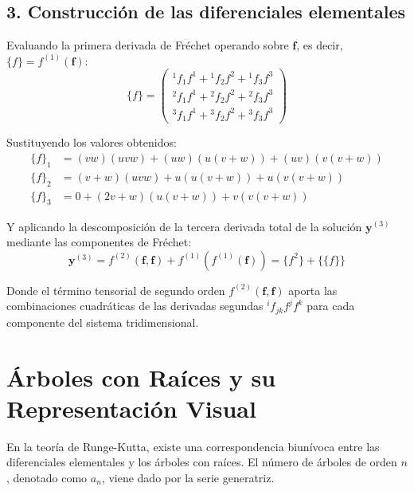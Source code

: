\subsection*{3. Construcción de las diferenciales elementales}

Evaluando la primera derivada de Fréchet operando sobre $\mathbf{f}$, es decir, $\{f\} = f^{(1)}(\mathbf{f})$:
$$ \{f\} = \begin{pmatrix} 
    {^1}f_1 f^1 + {^1}f_2 f^2 + {^1}f_3 f^3 \\ 
    {^2}f_1 f^1 + {^2}f_2 f^2 + {^2}f_3 f^3 \\ 
    {^3}f_1 f^1 + {^3}f_2 f^2 + {^3}f_3 f^3 
\end{pmatrix} $$

Sustituyendo los valores obtenidos:
\begin{align*}
    \{f\}_1 &= (vw)(uvw) + (uw)(u(v+w)) + (uv)(v(v+w)) \\
    \{f\}_2 &= (v+w)(uvw) + u(u(v+w)) + u(v(v+w)) \\
    \{f\}_3 &= 0 + (2v+w)(u(v+w)) + v(v(v+w))
\end{align*}

Y aplicando la descomposición de la tercera derivada total de la solución $\mathbf{y}^{(3)}$ mediante las componentes de Fréchet:
$$ \mathbf{y}^{(3)} = f^{(2)}(\mathbf{f}, \mathbf{f}) + f^{(1)}(f^{(1)}(\mathbf{f})) = \{f^2\} + \{\{f\}\} $$

Donde el término tensorial de segundo orden $f^{(2)}(\mathbf{f}, \mathbf{f})$ aporta las combinaciones cuadráticas de las derivadas segundas ${^i}f_{jk} f^j f^k$ para cada componente del sistema tridimensional.








\section{Árboles con Raíces y su Representación Visual}

En la teoría de Runge-Kutta, existe una correspondencia biunívoca entre las diferenciales elementales y los árboles con raíces. El número de árboles de orden $n$, denotado como $a_n$, viene dado por la serie generatriz. 

